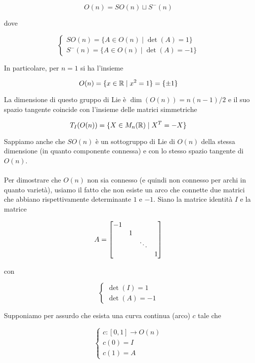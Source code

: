 \begin{equation}
	O(n) = SO(n) \sqcup S^{-}(n)
\end{equation}

dove

\begin{equation}
	\begin{cases}
		SO(n) = \{ A \in O(n) \mid \det(A) = 1 \}\\
		S^{-}(n) = \{ A \in O(n) \mid \det(A) = -1 \}
	\end{cases}
\end{equation}

In particolare, per $ n=1 $ si ha l'insieme

\begin{equation}
	O(n) = \{ x \in \mathbb{R} \mid x^{2} = 1 \} = \{ \pm 1 \}
\end{equation}

La dimensione di questo gruppo di Lie è $ \dim(O(n)) = n(n-1)/2 $ e il suo spazio tangente coincide con l'insieme delle matrici simmetriche

\begin{equation}
	T_{I}(O(n)) = \{ X \in M_{n}(\mathbb{R}) \mid X^{T} = -X \}
\end{equation}

Sappiamo anche che $ SO(n) $ è un sottogruppo di Lie di $ O(n) $ della stessa dimensione (in quanto componente connessa) e con lo stesso spazio tangente di $ O(n) $.\\\\
%
Per dimostrare che $ O(n) $ non sia connesso (e quindi non connesso per archi in quanto varietà), usiamo il fatto che non esiste un arco che connette due matrici che abbiano rispettivamente determinante $ 1 $ e $ -1 $. Siano la matrice identità $ I $ e la matrice

\begin{equation}
	A = \bmqty{\dmat{-1,1,\ddots,1}}
\end{equation}

con

\begin{equation}
	\begin{cases}
		\det(I) = 1 \\
		\det(A) = - 1
	\end{cases}
\end{equation}

Supponiamo per assurdo che esista una curva continua (arco) $ c $ tale che

\begin{equation}
	\begin{cases}
		c : [0,1] \to O(n) \\
		c(0) = I \\
		c(1) = A
	\end{cases}
\end{equation}

